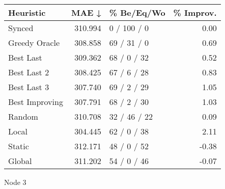 \begin{tabular}{lrlr}
\toprule
\textbf{Heuristic} & \textbf{MAE ↓} & \textbf{\% Be/Eq/Wo} & \textbf{\% Improv.} \\
\midrule
            Synced &        310.994 &          0 / 100 / 0 &                0.00 \\
     Greedy Oracle &        308.858 &          69 / 31 / 0 &                0.69 \\
         Best Last &        309.362 &          68 / 0 / 32 &                0.52 \\
       Best Last 2 &        308.425 &          67 / 6 / 28 &                0.83 \\
       Best Last 3 &        307.740 &          69 / 2 / 29 &                1.05 \\
    Best Improving &        307.791 &          68 / 2 / 30 &                1.03 \\
            Random &        310.708 &         32 / 46 / 22 &                0.09 \\
             Local &        304.445 &          62 / 0 / 38 &                2.11 \\
            Static &        312.171 &          48 / 0 / 52 &               -0.38 \\
            Global &        311.202 &          54 / 0 / 46 &               -0.07 \\
\bottomrule
\end{tabular}
\caption{Node 3}
\label{tab:iid_lr01_le1_bs4_3}

